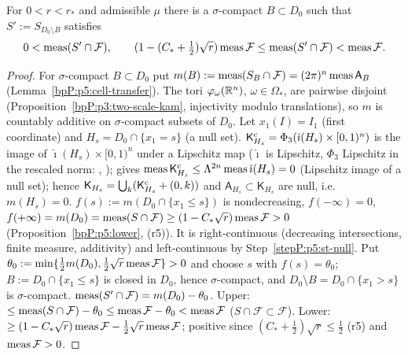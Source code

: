 \begin{proposition}\label{bpP:p5:strictness}
For $0<r<r_*$ and admissible $\mu$ there is a $\sigma$-compact $B\subset D_0$ such that $S':=S_{D_0\setminus B}$ satisfies
\[0<\operatorname{meas}(S'\cap\mathcal F),\qquad(1-(C_*+\tfrac12)\sqrt r)\operatorname{meas}\mathcal F\le\operatorname{meas}(S'\cap\mathcal F)<\operatorname{meas}\mathcal F.\]
\end{proposition}
\begin{proof}
\label{stepP:p5:st-add} For $\sigma$-compact $B\subset D_0$ put $m(B):=\operatorname{meas}(S_B\cap\mathcal F)=(2\pi)^n\operatorname{meas}\mathsf A_B$ (Lemma~\ref{bpP:p5:cell-transfer}). The tori $\varphi_\omega(\mathbb{R}^n)$, $\omega\in\Omega_*$, are pairwise disjoint (Proposition~\ref{bpP:p3:two-scale-kam}, injectivity modulo translations), so $m$ is countably additive on $\sigma$-compact subsets of $D_0$.
\label{stepP:p5:st-null} Let $x_1(I)=I_1$ (first coordinate) and $H_s=D_0\cap\{x_1=s\}$ (a null set). $\mathsf K^{\rm c}_{H_s}=\Phi_3(\check\imath(H_s)\times[0,1)^n)$ is the image of $\check\imath(H_s)\times[0,1)^n$ under a Lipschitz map ($\check\imath$ is Lipschitz, $\Phi_3$ Lipschitz in the rescaled norm: , );  gives $\operatorname{meas}\mathsf K^{\rm c}_{H_s}\le\Lambda^{2n}\operatorname{meas}\check\imath(H_s)=0$ (Lipschitz image of a null set); hence $\mathsf K_{H_s}=\bigcup_k(\mathsf K^{\rm c}_{H_s}+(0,k))$ and $\mathsf A_{H_s}\subset\mathsf K_{H_s}$ are null, i.e.\ $m(H_s)=0$.
\label{stepP:p5:st-ivt} $f(s):=m(D_0\cap\{x_1\le s\})$ is nondecreasing, $f(-\infty)=0$, $f(+\infty)=m(D_0)=\operatorname{meas}(S\cap\mathcal F)\ge(1-C_*\sqrt r)\operatorname{meas}\mathcal F>0$ (Proposition~\ref{bpP:p5:lower}, (r5)). It is right-continuous (decreasing intersections, finite measure, additivity) and left-continuous by Step~\ref{stepP:p5:st-null}. Put $\theta_0:=\min\{\frac12m(D_0),\frac12\sqrt r\operatorname{meas}\mathcal F\}>0$ and choose $s$ with $f(s)=\theta_0$; $B:=D_0\cap\{x_1\le s\}$ is closed in $D_0$, hence $\sigma$-compact, and $D_0\setminus B=D_0\cap\{x_1>s\}$ is $\sigma$-compact.
\label{stepP:p5:st-conc} $\operatorname{meas}(S'\cap\mathcal F)=m(D_0)-\theta_0$. Upper: $\le\operatorname{meas}(S\cap\mathcal F)-\theta_0\le\operatorname{meas}\mathcal F-\theta_0<\operatorname{meas}\mathcal F$ ($S\cap\mathcal F\subset\mathcal F$). Lower: $\ge(1-C_*\sqrt r)\operatorname{meas}\mathcal F-\frac12\sqrt r\operatorname{meas}\mathcal F$; positive since $(C_*+\frac12)\sqrt r\le\frac12$ (r5) and $\operatorname{meas}\mathcal F>0$.
\end{proof}

